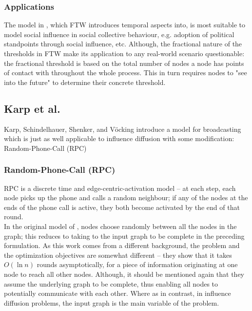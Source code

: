 \documentclass[twocolumn, 10pt]{article}
\begin{document}
\subsubsection{Applications}
The model in \cite{duncan}, which FTW introduces temporal aspects into, is most suitable to model social influence in social collective behaviour, e.g. adoption of political standpoints through social influence, etc. Although, the fractional nature of the thresholds in FTW make its application to any real-world scenario questionable: the fractional threshold is based on the total number of nodes a node has points of contact with throughout the whole process. This in turn requires nodes to "see into the future" to determine their concrete threshold.
\subsection{Karp et al. \cite{karp}}
Karp, Schindelhauer, Shenker, and V\"ocking introduce a model for broadcasting which is just as well applicable to influence diffusion with some modification: Random-Phone-Call (RPC)
\subsubsection{Random-Phone-Call (RPC)}
RPC is a discrete time and edge-centric-activation model -- at each step, each node picks up the phone and calls a random neighbour; if any of the nodes at the ends of the phone call is active, they both become activated by the end of that round. \\
In the original model of \cite{karp}, nodes choose randomly between all the nodes in the graph; this reduces to taking to the input graph to be complete in the preceding formulation. As this work comes from a different background, the problem and the optimization objectives are somewhat different -- they show that it takes $O(\ln n)$ rounds asymptotically, for a piece of information originating at one node to reach all other nodes. Although, it should be mentioned again that they assume the underlying graph to be complete, thus enabling all nodes to potentially communicate with each other. Where as in contrast, in influence diffusion problems, the input graph is the main variable of the problem.
\end{document}
